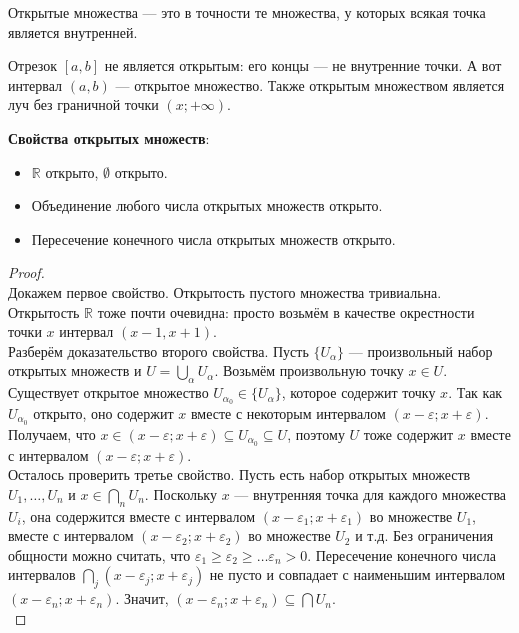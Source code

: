\documentclass{report}
\begin{document}
Открытые множества — это в точности те множества, у которых всякая точка является внутренней.

Отрезок $[a,b]$ не является открытым: его концы — не внутренние точки. А вот интервал $(a,b)$ — открытое множество. Также открытым множеством является луч без граничной точки $(x; +\infty)$.


\textbf{Свойства открытых множеств}:
\begin{itemize}
\item $\mathbb{R}$ открыто, $\emptyset$ открыто.
\item Объединение любого числа открытых множеств открыто.
\item Пересечение конечного числа открытых множеств открыто.
\end{itemize}

\begin{proof}\\

Докажем первое свойство. Открытость пустого множества тривиальна. Открытость $\mathbb{R}$ тоже почти очевидна: просто возьмём в качестве окрестности точки $x$ интервал $(x-1, x+1)$.\\

Разберём доказательство второго свойства. Пусть $\{U_{\alpha}\}$ — произвольный набор открытых множеств и $U = \bigcup_{\alpha} U_{\alpha}$. Возьмём произвольную точку $x \in U$. Существует открытое множество $U_{\alpha_0} \in \{U_{\alpha}\}$, которое содержит точку $x$. Так как $U_{\alpha_0}$ открыто, оно содержит $x$ вместе с некоторым интервалом $(x-\varepsilon; x+\varepsilon)$. Получаем, что $x \in (x-\varepsilon; x+\varepsilon) \subseteq U_{\alpha_0} \subseteq U$, поэтому $U$ тоже содержит $x$ вместе с интервалом $(x-\varepsilon; x+\varepsilon)$. \\

Осталось проверить третье свойство. Пусть есть набор открытых множеств $U_1, \ldots, U_n$ и $x \in \bigcap_n U_n$. Поскольку $x$ — внутренняя точка для каждого множества $U_i$, она содержится вместе с интервалом $(x-\varepsilon_1; x+\varepsilon_1)$ во множестве $U_1$, вместе с интервалом $(x-\varepsilon_2; x+\varepsilon_2)$ во множестве $U_2$ и т.д. Без ограничения общности можно считать, что $\varepsilon_1 \geq \varepsilon_2 \geq \ldots \varepsilon_n>0$. Пересечение конечного числа интервалов $\bigcap_j (x-\varepsilon_j; x+\varepsilon_j)$ не пусто и совпадает с наименьшим интервалом $(x-\varepsilon_n; x+\varepsilon_n)$. Значит, $(x-\varepsilon_n; x+\varepsilon_n) \subseteq \bigcap U_n$.\\
\end{proof}
\end{document}

